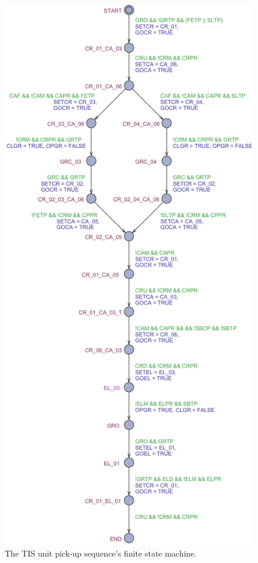 \begin{bibunit}
\begin{figure}[h!]
    \centering
    \includegraphics[width=0.95\columnwidth]{MX_Papers/Paper4/pictures/lilli03.png}
    \caption{The TIS unit pick-up sequence's finite state machine.} 
    \label{fig:fsm}
\end{figure}


\end{bibunit}
